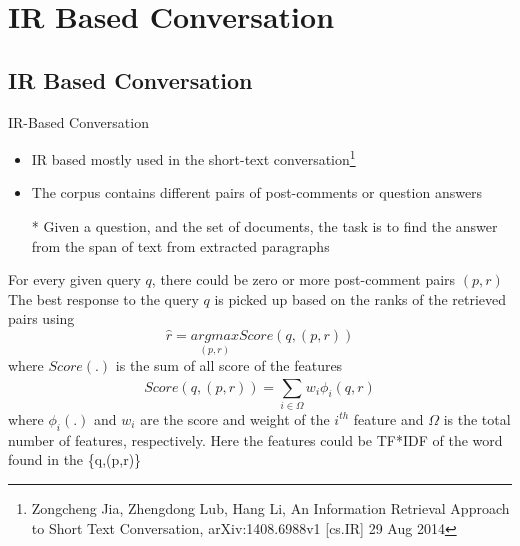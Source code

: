 \section{IR Based Conversation}
\subsection{IR Based Conversation}


\begin{frame}[shrink=10]{IR-Based Conversation}
\begin{multicols}{2}
\begin{itemize}
	\item IR based mostly used in the short-text conversation\footnote{Zongcheng Jia, Zhengdong Lub, Hang Li, An Information Retrieval Approach to Short Text Conversation, arXiv:1408.6988v1  [cs.IR]  29 Aug 2014}
	\item The corpus contains different pairs of post-comments or question answers
	\item[*] Given a question, and the set of documents, the task is to find the answer from the span of text from extracted paragraphs
\end{itemize}
For every given query $q$, there could be zero or more post-comment pairs $(p,r)$
The best response to the query $q$ is picked up based on the ranks of the retrieved pairs using
\begin{equation}
\hat{r} = \underset{(p,r)}{argmax}Score (q,(p,r))
\end{equation}
where $Score(.)$ is the sum of all score of the features
\begin{equation}
Score(q,(p,r)) = \sum_{i\in \Omega}^{}w_i\phi_i(q,r)
\end{equation}
where $\phi_i(.)$ and $w_i$ are the score and weight of the $i^{th}$ feature and $\Omega$ is the total number of features, respectively. Here the features could be TF*IDF of the word found in the \{q,(p,r)\}
\end{multicols}

\end{frame}

